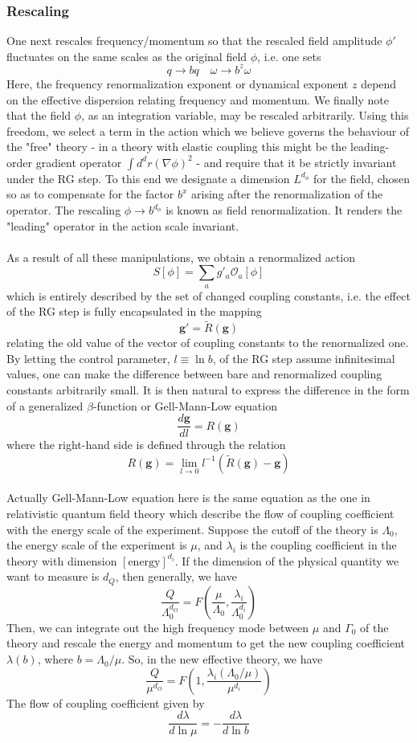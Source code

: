 \documentclass[cyan]{elegantnote}
\begin{document}
\subsubsection{Rescaling}
One next rescales frequency/momentum so that the rescaled field amplitude $\phi'$ fluctuates on the same scales as the original field $\phi$, i.e. one sets
\[q \to bq \quad \omega \to b^z \omega\]
Here, the frequency renormalization exponent or dynamical exponent $z$ depend on the effective dispersion relating
frequency and momentum. 
We finally note that the field $\phi$, as an integration variable, may be rescaled arbitrarily. Using this freedom, we select a term in the action which we believe governs the behaviour of the "free" theory - in a theory with elastic coupling this might be the leading-order gradient operator $\int d^d r (\nabla \phi)^2$ - and require that it be strictly invariant under the RG step. 
To this end we designate a dimension $L^{d_{\phi}}$ for the field, chosen so as to compensate for the factor $b^x$ arising after the renormalization of the operator. The rescaling $\phi \to b^{d_{\phi}}$ is known as field renormalization. It renders the "leading" operator in the action scale invariant.
\\ \\
As a result of all these manipulations, we obtain a renormalized action
\[S[\phi] = \sum_a g'_a \mathcal{O}_a[\phi]\]
which is entirely described by the set of changed coupling constants, i.e. the effect of the RG step is fully encapsulated in the mapping
\[\bm{g}' = \tilde{R}(\bm{g})\]
relating the old value of the vector of coupling constants to the renormalized one. 
By letting the control parameter, $l \equiv \ln b$, of the RG step assume infinitesimal values, one can make the difference between bare and renormalized coupling constants
arbitrarily small. 
It is then natural to express the difference in the form of a generalized $\beta$-function or Gell-Mann-Low equation
\[\frac{d\bm{g}}{dl} = R(\bm{g})\]
where the right-hand side is defined through the relation
\[R(\bm{g}) = \lim_{l \to 0} l^{-1} (\tilde{R}(\bm{g}) - \bm{g})\]
\\
Actually Gell-Mann-Low equation here is the same equation as the one in relativistic quantum field theory which describe the flow of coupling coefficient with the energy scale of the experiment. Suppose the cutoff of the theory is $\Lambda_0$, the energy scale of the experiment is $\mu$, and $\lambda_i$ is the coupling coefficient in the theory with dimension $[\mbox{energy}] ^{d_{i}}$. If the dimension of the physical quantity we want to measure is $d_Q$, then generally, we have
\[\frac{Q}{\Lambda_0^{d_O}} = F(\frac{\mu}{\Lambda_0},\frac{\lambda_i}{\Lambda_0^{d_i}})\]
Then, we can integrate out the high frequency mode between $\mu$ and $\Gamma_0$ of the theory and rescale the energy and momentum to get the new coupling coefficient $\lambda(b)$, where $b = \Lambda_0 / \mu$. So, in the new effective theory, we have
\[\frac{Q}{\mu^{d_O}} = F(1,\frac{\lambda_i(\Lambda_0 / \mu)}{\mu^{d_i}})\]
The flow of coupling coefficient given by
\[\frac{d\lambda}{d\ln \mu} = - \frac{d\lambda}{d\ln b}\]
\end{document}
